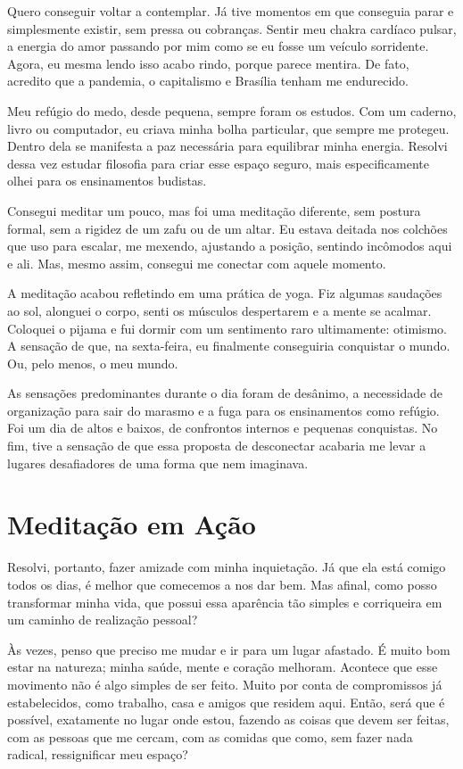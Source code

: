 Quero conseguir voltar a contemplar. Já tive momentos em que conseguia parar e simplesmente existir, sem pressa ou cobranças. Sentir meu chakra cardíaco pulsar, a energia do amor passando por mim como se eu fosse um veículo sorridente. Agora, eu mesma lendo isso acabo rindo, porque parece mentira. De fato, acredito que a pandemia, o capitalismo e Brasília tenham me endurecido.

Meu refúgio do medo, desde pequena, sempre foram os estudos. Com um caderno, livro ou computador, eu criava minha bolha particular, que sempre me protegeu. Dentro dela se manifesta a paz necessária para equilibrar minha energia. Resolvi dessa vez estudar filosofia para criar esse espaço seguro, mais especificamente olhei para os ensinamentos budistas.

Consegui meditar um pouco, mas foi uma meditação diferente, sem postura formal, sem a rigidez de um zafu ou de um altar. Eu estava deitada nos colchões que uso para escalar, me mexendo, ajustando a posição, sentindo incômodos aqui e ali. Mas, mesmo assim, consegui me conectar com aquele momento.

A meditação acabou refletindo em uma prática de yoga. Fiz algumas saudações ao sol, alonguei o corpo, senti os músculos despertarem e a mente se acalmar. Coloquei o pijama e fui dormir com um sentimento raro ultimamente: otimismo. A sensação de que, na sexta-feira, eu finalmente conseguiria conquistar o mundo. Ou, pelo menos, o meu mundo.

As sensações predominantes durante o dia foram de desânimo, a necessidade de organização para sair do marasmo e a fuga para os ensinamentos como refúgio. Foi um dia de altos e baixos, de confrontos internos e pequenas conquistas. No fim, tive a sensação de que essa proposta de desconectar acabaria me levar a lugares desafiadores de uma forma que nem imaginava.

\section{Meditação em Ação}

Resolvi, portanto, fazer amizade com minha inquietação. Já que ela está comigo todos os dias, é melhor que comecemos a nos dar bem. Mas afinal, como posso transformar minha vida, que possui essa aparência tão simples e corriqueira em um caminho de realização pessoal?

Às vezes, penso que preciso me mudar e ir para um lugar afastado. É muito bom estar na natureza; minha saúde, mente e coração melhoram. Acontece que esse movimento não é algo simples de ser feito. Muito por conta de compromissos já estabelecidos, como trabalho, casa e amigos que residem aqui. Então, será que é possível, exatamente no lugar onde estou, fazendo as coisas que devem ser feitas, com as pessoas que me cercam, com as comidas que como, sem fazer nada radical, ressignificar meu espaço?

